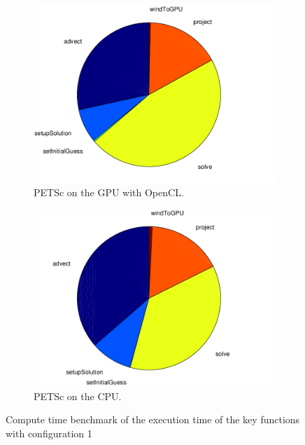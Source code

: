 \begin{figure}[ht]
	\center
	
	\begin{subfigure}{0.45\textwidth}
		\center
		\includegraphics[width=1.0\textwidth]{results/data/td/td_conf1_petsc_gpu}
		\caption{PETSc on the GPU with OpenCL.}
		\label{fig:td_conf1_petsc_gpu}
	\end{subfigure}
	\begin{subfigure}{0.45\textwidth}
		\center
		\includegraphics[width=1.0\textwidth]{results/data/td/td_conf1_petsc_cpu}
		\caption{PETSc on the CPU.}
		\label{fig:td_conf1_petsc_cpu}
	\end{subfigure}
	\caption{Compute time benchmark of the execution time of the key functions
			with configuration 1}
	\label{fig:td_conf1}
	
\end{figure}

